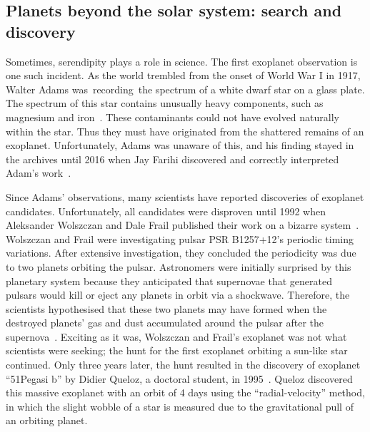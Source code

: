 \subsection{Planets beyond the solar system: search and discovery}
Sometimes, serendipity plays a role in science.
The first  exoplanet observation is one such incident.
As the world trembled from the onset of World War I in 1917, Walter Adams was recording the spectrum of a white dwarf star on a glass plate.
The spectrum of this star contains unusually heavy components, such as magnesium and iron~\cite{Farihi:2016:NewAR}.
These contaminants could not have evolved naturally within the star. 
Thus they must have originated from the shattered remains of an exoplanet.
Unfortunately, Adams was unaware of this, and his finding stayed in the archives until 2016 when Jay Farihi discovered and correctly interpreted Adam's work~\cite{Farihi:2016:NewAR}.

Since Adams' observations, many scientists have reported discoveries of exoplanet candidates.
Unfortunately, all candidates were disproven until 1992 when Aleksander Wolszczan and Dale Frail published their work on a bizarre system~\cite{wolszczan1992planetary}. 
Wolszczan and Frail were investigating  pulsar PSR B1257+12's periodic timing variations.
After extensive investigation, they concluded the periodicity was due to two planets orbiting the pulsar. 
Astronomers were initially surprised by this planetary system because they anticipated that supernovae that generated pulsars would kill or eject any planets in orbit via a shockwave. 
Therefore, the scientists hypothesised that these two planets may have formed when the destroyed planets' gas and dust accumulated around the pulsar after the supernova~\cite{wolszczan1992planetary}.
Exciting as it was, Wolszczan and Frail's exoplanet was not what scientists were seeking; the hunt for the first exoplanet orbiting a sun-like star continued.
Only three years later, the hunt resulted in the discovery of exoplanet ``51Pegasi b'' by Didier Queloz, a doctoral student, in 1995~\cite{mayor1995jupiter}.
Queloz discovered this massive exoplanet with an orbit of 4 days using the ``radial-velocity'' method, in which the slight wobble of a star is measured due to the gravitational pull of an orbiting planet. 


